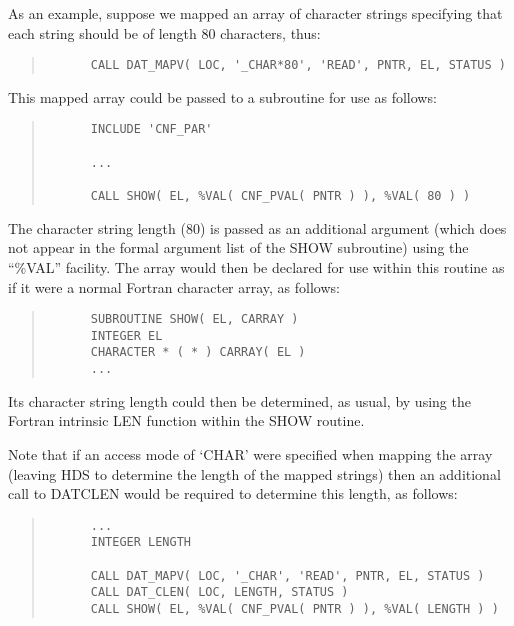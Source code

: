 \documentclass[twoside,11pt]{article}
\newcommand{\htmlref}[2]{#1}
\renewcommand{\_}{\texttt{\symbol{95}}}
\newcommand{\qt}[1]{``#1''}
\newcommand{\qt}[1]{{\tt{"}}#1{\tt{"}}}
\begin{document}
As an example, suppose we mapped an array of character strings
specifying that each string should be of length 80 characters, thus:

\small
\begin{quote}
\begin{verbatim}
      CALL DAT_MAPV( LOC, '_CHAR*80', 'READ', PNTR, EL, STATUS )
\end{verbatim}
\end{quote}
\normalsize

This mapped array could be passed to a subroutine for use as follows:

\small
\begin{quote}
\begin{verbatim}
      INCLUDE 'CNF_PAR'

      ...

      CALL SHOW( EL, %VAL( CNF_PVAL( PNTR ) ), %VAL( 80 ) )
\end{verbatim}
\end{quote}
\normalsize

The character string length (80) is passed as an additional argument
(which does not appear in the formal argument list of the SHOW
subroutine) using the \qt{\%VAL} facility. The array would then be
declared for use within this routine as if it were a normal Fortran
character array, as follows:

\small
\begin{quote}
\begin{verbatim}
      SUBROUTINE SHOW( EL, CARRAY )
      INTEGER EL
      CHARACTER * ( * ) CARRAY( EL )
      ...
\end{verbatim}
\end{quote}
\normalsize

Its character string length could then be determined, as usual, by
using the Fortran intrinsic LEN function within the SHOW routine.

Note that if an access mode of `\_CHAR' were specified when mapping
the array (leaving HDS to determine the length of the mapped strings)
then an additional call to \htmlref{DAT\_CLEN}{DAT_CLEN} would be
required to determine this length, as follows:

\small
\begin{quote}
\begin{verbatim}
      ...
      INTEGER LENGTH

      CALL DAT_MAPV( LOC, '_CHAR', 'READ', PNTR, EL, STATUS )
      CALL DAT_CLEN( LOC, LENGTH, STATUS )
      CALL SHOW( EL, %VAL( CNF_PVAL( PNTR ) ), %VAL( LENGTH ) )
\end{verbatim}
\end{quote}
\normalsize
\end{document}
